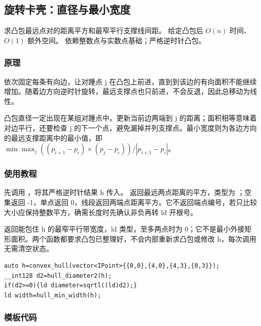 \subsection{旋转卡壳：直径与最小宽度}
\label{geo:calipers}
\AlgorithmInfo
    {求凸包最远点对的距离平方和最窄平行支撑线间距。}
    {给定凸包后 $O(n)$ 时间、$O(1)$ 额外空间。}
    {依赖整数点与实数点基础；严格逆时针凸包。}
\subsubsection*{原理}

依次固定每条有向边，让对踵点 j 在凸包上前进，直到到该边的有向面积不能继续增加。随着边方向逆时针旋转，最远支撑点也只前进，不会反退，因此总移动为线性。

凸包直径一定出现在某组对踵点中。更新当前边两端到 j 的距离；面积相等意味着对边平行，还要检查 j 的下一个点，避免漏掉并列支撑点。最小宽度则为各边方向的最远支撑距离中的最小值，即 $\min \max_j((p_{i+1}-p_i)\times(p_j-p_i))/|p_{i+1}-p_i|$。

\subsubsection*{使用教程}
先调用 ，将其严格逆时针结果 h 传入。 返回最远两点距离的平方，类型为 ；空集返回 -1，单点返回 0，线段返回两端点距离平方。它不返回端点编号，若只比较大小应保持整数平方，确需长度时先确认非负再转 ld 开根号。

 返回能包住 h 的最窄平行带宽度，ld 类型，至多两点时为 0；它不是最小外接矩形面积。两个函数都要求凸包已整理好，不会内部重新求凸包或修改 h，每次调用无需清空状态。
\begin{lstlisting}[style=mtycpp,numbers=none]
auto h=convex_hull(vector<IPoint>{{0,0},{4,0},{4,3},{0,3}});
__int128 d2=hull_diameter2(h);
if(d2>=0){ld diameter=sqrtl((ld)d2);}
ld width=hull_min_width(h);
\end{lstlisting}
\subsubsection*{模板代码}
